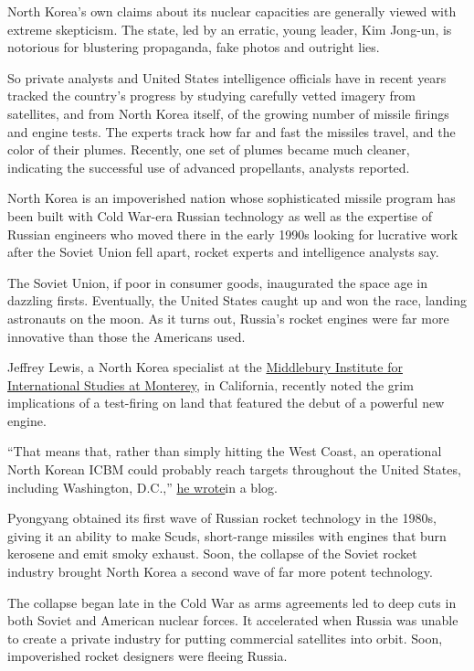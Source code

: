 North Korea's own claims about its nuclear capacities are generally
viewed with extreme skepticism. The state, led by an erratic, young
leader, Kim Jong-un, is notorious for blustering propaganda, fake photos
and outright lies.

So private analysts and United States intelligence officials have in
recent years tracked the country's progress by studying carefully vetted
imagery from satellites, and from North Korea itself, of the growing
number of missile firings and engine tests. The experts track how far
and fast the missiles travel, and the color of their plumes. Recently,
one set of plumes became much cleaner, indicating the successful use of
advanced propellants, analysts reported.

North Korea is an impoverished nation whose sophisticated missile
program has been built with Cold War-era Russian technology as well as
the expertise of Russian engineers who moved there in the early 1990s
looking for lucrative work after the Soviet Union fell apart, rocket
experts and intelligence analysts say.

The Soviet Union, if poor in consumer goods, inaugurated the space age
in dazzling firsts. Eventually, the United States caught up and won the
race, landing astronauts on the moon. As it turns out, Russia's rocket
engines were far more innovative than those the Americans used.

Jeffrey Lewis, a North Korea specialist at the
\href{http://www.miis.edu/}{Middlebury Institute for International
Studies at Monterey}, in California, recently noted the grim
implications of a test-firing on land that featured the debut of a
powerful new engine.

``That means that, rather than simply hitting the West Coast, an
operational North Korean ICBM could probably reach targets throughout
the United States, including Washington, D.C.,''
\href{http://www.armscontrolwonk.com/archive/1201278/north-korea-tests-a-fancy-new-rocket-engine/}{he
wrote}in a blog.

Pyongyang obtained its first wave of Russian rocket technology in the
1980s, giving it an ability to make Scuds, short-range missiles with
engines that burn kerosene and emit smoky exhaust. Soon, the collapse of
the Soviet rocket industry brought North Korea a second wave of far more
potent technology.

The collapse began late in the Cold War as arms agreements led to deep
cuts in both Soviet and American nuclear forces. It accelerated when
Russia was unable to create a private industry for putting commercial
satellites into orbit. Soon, impoverished rocket designers were fleeing
Russia.

